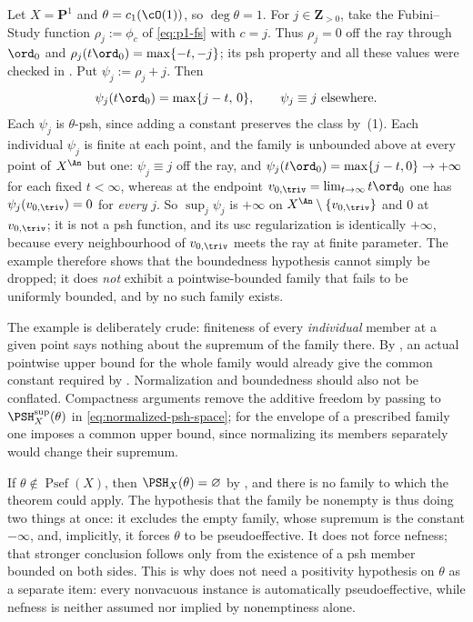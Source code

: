 \begin{example}
\label{ex:ch37-pointwise-not-uniform}
Let $X=\mathbf P^1$ and $\theta=c_1(\cO(1))$, so $\deg\theta=1$.  For
$j\in\mathbf Z_{>0}$, take the Fubini--Study function
$\rho_j:=\phi_c$ of \eqref{eq:p1-fs} with $c=j$.  Thus
$\rho_j=0$ off the ray through $\ord_0$ and
$\rho_j(t\ord_0)=\max\{-t,-j\}$; its psh property and all these values
were checked in .  Put $\psi_j:=\rho_j+j$.  Then
\[
 \psi_j(t\ord_0)=\max\{j-t,\,0\},
 \qquad
 \psi_j\equiv j\ \text{elsewhere}.
\]
Each $\psi_j$ is $\theta$-psh, since adding a constant preserves the
class by \,(1).  Each individual $\psi_j$ is
finite at each point, and the family is unbounded above at every point of
$X^{\An}$ but one: $\psi_j\equiv j$ off the ray, and
$\psi_j(t\ord_0)=\max\{j-t,0\}\to+\infty$ for each fixed $t<\infty$,
whereas at the endpoint $v_{0,\triv}=\lim_{t\to\infty}t\ord_0$ one has
$\psi_j(v_{0,\triv})=0$ for \emph{every} $j$.  So $\sup_j\psi_j$ is
$+\infty$ on $X^{\An}\setminus\{v_{0,\triv}\}$ and $0$ at
$v_{0,\triv}$; it is not a psh function, and its usc regularization is
identically $+\infty$, because every neighbourhood of $v_{0,\triv}$
meets the ray at finite parameter.  The
example therefore shows that the boundedness hypothesis cannot simply be
dropped; it does \emph{not} exhibit a pointwise-bounded family that fails to
be uniformly bounded, and by
 no such family exists.

The example is deliberately crude: finiteness of every \emph{individual}
member at a given point says nothing about the supremum of the family there.
By , an actual pointwise upper bound
for the whole family would already give the common constant required by
.  Normalization and boundedness should also not
be conflated.  Compactness arguments remove the additive freedom by passing
to $\PSH_X^{\sup}(\theta)$ in \eqref{eq:normalized-psh-space}; for the
envelope of a prescribed family one imposes a common upper bound, since
normalizing its members separately would change their supremum.
\end{example}

\begin{example}
\label{ex:ch37-empty-class}
If $\theta\notin\operatorname{Psef}(X)$, then
$\PSH_X(\theta)=\varnothing$ by
, and there is no family to which the theorem
could apply.  The hypothesis that the family be nonempty is thus doing two
things at once: it excludes the empty family, whose supremum is the constant
$-\infty$, and, implicitly, it forces $\theta$ to be pseudoeffective.
It does not force nefness; that stronger conclusion follows only from the
existence of a psh member bounded on both sides.  This is why
 does not need a positivity hypothesis on
$\theta$ as a separate item: every nonvacuous instance is automatically
pseudoeffective, while nefness is neither assumed nor implied by
nonemptiness alone.
\end{example}

